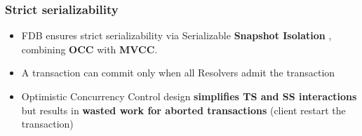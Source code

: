 \begin{frame}
	\frametitle{Strict serializability}
\begin{itemize}
  \item FDB ensures strict serializability via Serializable \textbf{Snapshot Isolation} , combining \textbf{OCC} with \textbf{MVCC}.
  \item A transaction can commit only when all Resolvers admit the transaction
  \item Optimistic Concurrency Control design \textbf{simplifies TS and SS interactions} but results in \textbf{wasted work for aborted transactions} (client restart the transaction)
\end{itemize}

 \end{frame}



